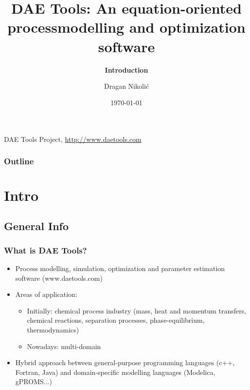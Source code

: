 \documentclass{beamer}
\begin{document}
\title[\textbf{DAE Tools} - Introduction]{\textbf{DAE Tools}: An equation-oriented process\linebreak modelling and optimization software}
\subtitle{\textbf{Introduction}}
\author{Dragan Nikolić}
\institute
{
  DAE Tools Project, \url{http://www.daetools.com}
}
\date{\today} 


\begin{frame}
\titlepage
\end{frame}

\begin{frame}
\frametitle{Outline}
\tableofcontents[currentsubsection, 
                 hideothersubsections, 
                 sectionstyle=show, 
                 subsectionstyle=hide]
\end{frame} 


\section{Intro}

\subsection{General Info}
\begin{frame}
\frametitle{What is DAE Tools?} 
\begin{block}{}
\begin{itemize}
  \item Process modelling, simulation, optimization and parameter estimation software (www.daetools.com)
  \item Areas of application:
    \begin{itemize}
      \item Initially: chemical process industry (mass, heat and momentum transfers, chemical reactions, separation processes, phase-equilibrium, thermodynamics)
      \item Nowadays: multi-domain
    \end{itemize}
  \item Hybrid approach between general-purpose programming languages (c++, Fortran, Java) and domain-specific modelling languages (Modelica, gPROMS...)
\end{itemize}
\end{block}
\end{frame}
\end{document}
